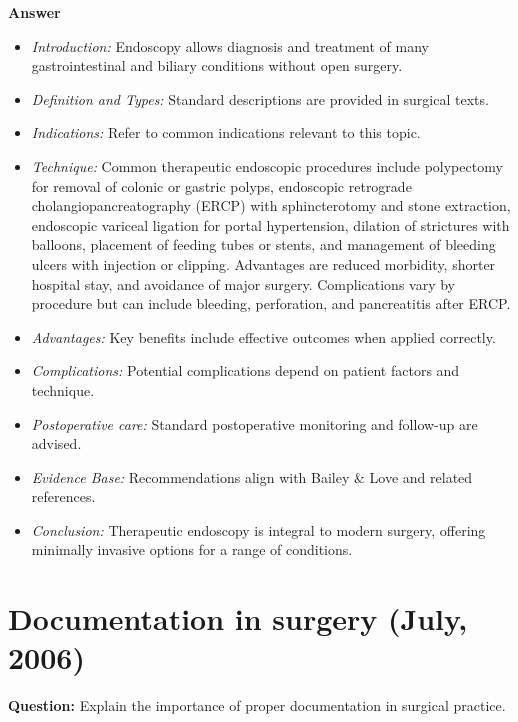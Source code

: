 \documentclass{article}
\begin{document}
\textbf{Answer}
\begin{itemize}

\item \emph{Introduction:} Endoscopy allows diagnosis and treatment of many gastrointestinal and biliary conditions without open surgery.
\item \emph{Definition and Types:} Standard descriptions are provided in surgical texts.
\item \emph{Indications:} Refer to common indications relevant to this topic.

\item \emph{Technique:} Common therapeutic endoscopic procedures include polypectomy for removal of colonic or gastric polyps, endoscopic retrograde cholangiopancreatography (ERCP) with sphincterotomy and stone extraction, endoscopic variceal ligation for portal hypertension, dilation of strictures with balloons, placement of feeding tubes or stents, and management of bleeding ulcers with injection or clipping. Advantages are reduced morbidity, shorter hospital stay, and avoidance of major surgery. Complications vary by procedure but can include bleeding, perforation, and pancreatitis after ERCP.
\item \emph{Advantages:} Key benefits include effective outcomes when applied correctly.
\item \emph{Complications:} Potential complications depend on patient factors and technique.
\item \emph{Postoperative care:} Standard postoperative monitoring and follow-up are advised.
\item \emph{Evidence Base:} Recommendations align with Bailey \& Love and related references.

\item \emph{Conclusion:} Therapeutic endoscopy is integral to modern surgery, offering minimally invasive options for a range of conditions.


\end{itemize}

\section{Documentation in surgery (July, 2006)}

\textbf{Question:} Explain the importance of proper documentation in surgical practice.
\end{document}
